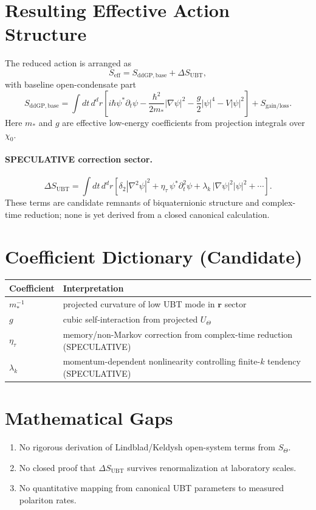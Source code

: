 \documentclass[11pt,a4paper]{article}
\begin{document}
\section{Resulting Effective Action Structure}
The reduced action is arranged as
\begin{equation}
S_{\mathrm{eff}}=S_{\mathrm{ddGP,base}}+\Delta S_{\mathrm{UBT}},
\end{equation}
with baseline open-condensate part
\begin{equation}
S_{\mathrm{ddGP,base}}=\int dt\,d^dr\left[i\hbar\psi^*\partial_t\psi-\frac{\hbar^2}{2m_*}|\nabla\psi|^2-\frac{g}{2}|\psi|^4-V|\psi|^2\right]+S_{\mathrm{gain/loss}}.
\end{equation}
Here $m_*$ and $g$ are effective low-energy coefficients from projection integrals over $\chi_0$.

\paragraph{SPECULATIVE correction sector.}
\begin{equation}
\Delta S_{\mathrm{UBT}}=\int dt\,d^dr\left[\delta_2|\nabla^2\psi|^2+\eta_\tau\,\psi^*\partial_t^2\psi+\lambda_k\,|\nabla\psi|^2|\psi|^2+\cdots\right].
\end{equation}
These terms are candidate remnants of biquaternionic structure and complex-time reduction; none is yet derived from a closed canonical calculation.

\section{Coefficient Dictionary (Candidate)}
\begin{center}
\begin{tabular}{@{}ll@{}}
\toprule
Coefficient & Interpretation \\
\midrule
$m_*^{-1}$ & projected curvature of low UBT mode in $\mathbf r$ sector \\
$g$ & cubic self-interaction from projected $U_\Theta$ \\
$\eta_\tau$ & memory/non-Markov correction from complex-time reduction (SPECULATIVE) \\
$\lambda_k$ & momentum-dependent nonlinearity controlling finite-$k$ tendency (SPECULATIVE) \\
\bottomrule
\end{tabular}
\end{center}

\section{Mathematical Gaps}
\begin{enumerate}
\item No rigorous derivation of Lindblad/Keldysh open-system terms from $S_\Theta$.
\item No closed proof that $\Delta S_{\mathrm{UBT}}$ survives renormalization at laboratory scales.
\item No quantitative mapping from canonical UBT parameters to measured polariton rates.
\end{enumerate}
\end{document}
